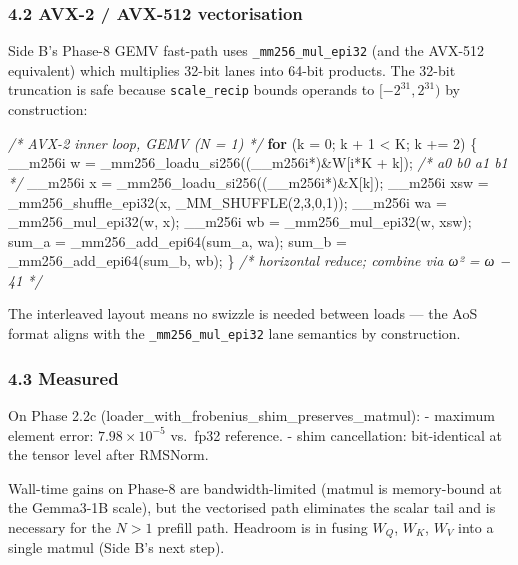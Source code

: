 \documentclass[
  11pt,
]{article}
\newenvironment{Shaded}{}{}
\newcommand{\CommentTok}[1]{\textcolor[rgb]{0.38,0.63,0.69}{\textit{#1}}}
\newcommand{\ControlFlowTok}[1]{\textcolor[rgb]{0.00,0.44,0.13}{\textbf{#1}}}
\newcommand{\DecValTok}[1]{\textcolor[rgb]{0.25,0.63,0.44}{#1}}
\newcommand{\NormalTok}[1]{#1}
\begin{document}
\hypertarget{avx-2-avx-512-vectorisation}{%
\subsubsection{4.2 AVX-2 / AVX-512
vectorisation}\label{avx-2-avx-512-vectorisation}}

Side B's Phase-8 GEMV fast-path uses \texttt{\_mm256\_mul\_epi32} (and
the AVX-512 equivalent) which multiplies 32-bit lanes into 64-bit
products. The 32-bit truncation is safe because \texttt{scale\_recip}
bounds operands to \([-2^{31}, 2^{31})\) by construction:

\begin{Shaded}
\begin{Highlighting}[]
\CommentTok{/* AVX{-}2 inner loop, GEMV (N = 1) */}
\ControlFlowTok{for}\NormalTok{ (k = }\DecValTok{0}\NormalTok{; k + }\DecValTok{1}\NormalTok{ \textless{} K; k += }\DecValTok{2}\NormalTok{) \{}
\NormalTok{    \_\_m256i w   = \_mm256\_loadu\_si256((\_\_m256i*)\&W[i*K + k]);   }\CommentTok{/* a0 b0 a1 b1 */}
\NormalTok{    \_\_m256i x   = \_mm256\_loadu\_si256((\_\_m256i*)\&X[k]);}
\NormalTok{    \_\_m256i xsw = \_mm256\_shuffle\_epi32(x, \_MM\_SHUFFLE(}\DecValTok{2}\NormalTok{,}\DecValTok{3}\NormalTok{,}\DecValTok{0}\NormalTok{,}\DecValTok{1}\NormalTok{));}
\NormalTok{    \_\_m256i wa  = \_mm256\_mul\_epi32(w, x);}
\NormalTok{    \_\_m256i wb  = \_mm256\_mul\_epi32(w, xsw);}
\NormalTok{    sum\_a = \_mm256\_add\_epi64(sum\_a, wa);}
\NormalTok{    sum\_b = \_mm256\_add\_epi64(sum\_b, wb);}
\NormalTok{\}}
\CommentTok{/* horizontal reduce; combine via ω² = ω − 41 */}
\end{Highlighting}
\end{Shaded}

The interleaved layout means no swizzle is needed between loads --- the
AoS format aligns with the \texttt{\_mm256\_mul\_epi32} lane semantics
by construction.

\hypertarget{measured}{%
\subsubsection{4.3 Measured}\label{measured}}

On Phase 2.2c (loader\_with\_frobenius\_shim\_preserves\_matmul): -
maximum element error: \(7.98 \times 10^{-5}\) vs.~fp32 reference. -
shim cancellation: bit-identical at the tensor level after RMSNorm.

Wall-time gains on Phase-8 are bandwidth-limited (matmul is memory-bound
at the Gemma3-1B scale), but the vectorised path eliminates the scalar
tail and is necessary for the \(N\!>\!1\) prefill path. Headroom is in
fusing \(W_Q\), \(W_K\), \(W_V\) into a single matmul (Side B's next
step).
\end{document}
